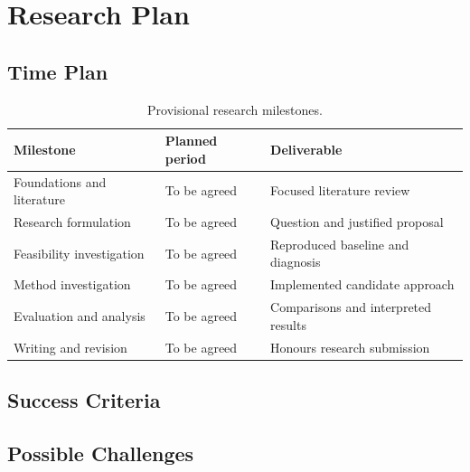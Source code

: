 \chapter{Research Plan}
\label{chap:plan}

\section{Time Plan}

\begin{table}[htbp]
  \centering
  \small
  \renewcommand{\arraystretch}{1.3}
  \begin{tabularx}{\textwidth}{@{}p{}p{}X@{}}
    \toprule
    Milestone & Planned period & Deliverable \\
    \midrule
    Foundations and literature & To be agreed & Focused literature review \\
    Research formulation & To be agreed & Question and justified proposal \\
    Feasibility investigation & To be agreed & Reproduced baseline and diagnosis \\
    Method investigation & To be agreed & Implemented candidate approach \\
    Evaluation and analysis & To be agreed & Comparisons and interpreted results \\
    Writing and revision & To be agreed & Honours research submission \\
    \bottomrule
  \end{tabularx}
  \caption{Provisional research milestones.}
  \label{tab:timeline}
\end{table}

\section{Success Criteria}

\section{Possible Challenges}
